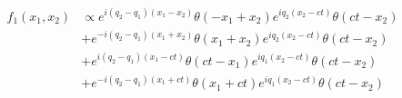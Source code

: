 \documentclass[aps,showpacs,groupedaddress]{revtex4}
\begin{document}
\begin{equation}
\label{eq1}
\begin{split}
f_{1}(x_{1},x_{2})&\propto e^{i(q_{2}-q_{1})(x_{1}-x_{2})}\theta(-x_{1}+x_{2})e^{iq_{2}(x_{2}-ct)}\theta(ct-x_{2})\\
&+e^{-i(q_{2}-q_{1})(x_{1}+x_{2})}\theta(x_{1}+x_{2})e^{iq_{2}(x_{2}-ct)}\theta(ct-x_{2})\\
&+e^{i(q_{2}-q_{1})(x_{1}-ct)}\theta(ct-x_{1})e^{iq_{1}(x_{2}-ct)}\theta(ct-x_{2})\\
&+e^{-i(q_{2}-q_{1})(x_{1}+ct)}\theta(x_{1}+ct)e^{iq_{1}(x_{2}-ct)}\theta(ct-x_{2})
\end{split}
\end{equation}
\end{document}
